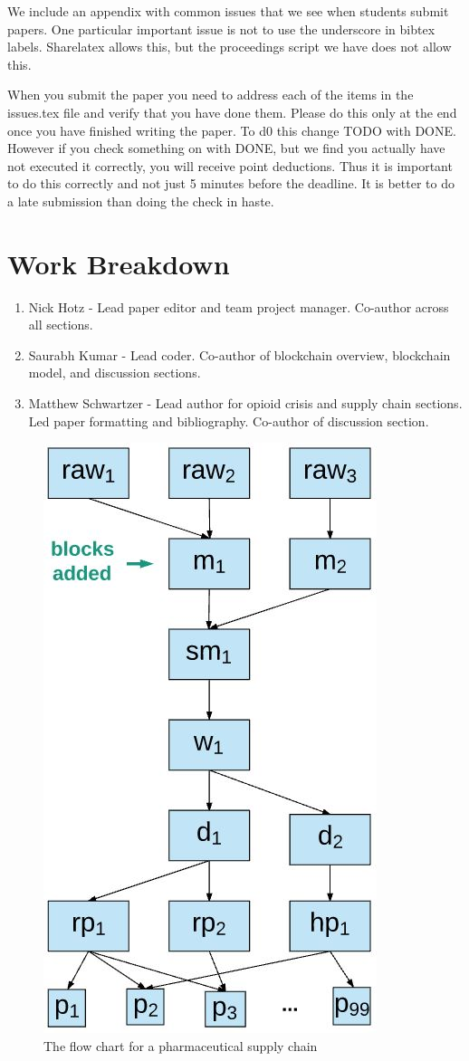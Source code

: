 \documentclass[sigconf]{acmart}
\begin{document}
\appendix
We include an appendix with common issues that we see when students
submit papers. One particular important issue is not to use the
underscore in bibtex labels. Sharelatex allows this, but the
proceedings script we have does not allow this.

When you submit the paper you need to address each of the items in the
issues.tex file and verify that you have done them. Please do this
only at the end once you have finished writing the paper. To d0 this
change TODO with DONE. However if you check something on with DONE, but
we find you actually have not executed it correctly, you will receive
point deductions. Thus it is important to do this correctly and not
just 5 minutes before the deadline. It is better to do a late
submission than doing the check in haste. 


\section{Work Breakdown}
\begin{enumerate}
   \item Nick Hotz - Lead paper editor and team project manager. Co-author across all sections. 
   \item Saurabh Kumar - Lead coder.  Co-author of blockchain overview, blockchain model, and discussion sections.
   \item Matthew Schwartzer - Lead author for opioid crisis and supply chain sections. Led paper formatting and bibliography. Co-author of discussion section.
\end{enumerate}

\begin{figure}[!ht]
 \centering\includegraphics[width=0.5\columnwidth]{images/supply-chain-model.JPG}
  \caption{The flow chart for a pharmaceutical supply chain}\label{f:supplychainmodel}
\end{figure}
\end{document}
